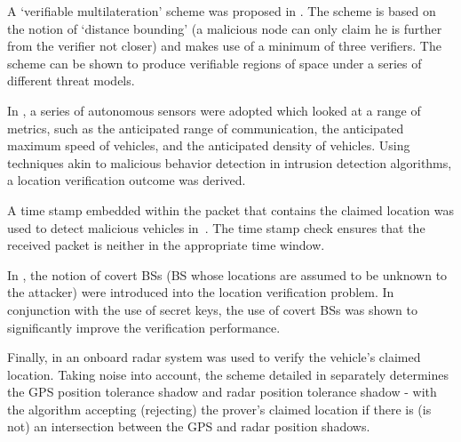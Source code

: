 \documentclass[journal]{IEEEtran}
\begin{document}
A `verifiable multilateration' scheme was proposed in \cite{capkun2006secure}. The scheme is based on the notion of `distance bounding' (a malicious node can only claim he is further from the verifier not closer) and makes use of a minimum of three verifiers. The scheme can be shown to produce verifiable regions of space under a series of different threat models.

In \cite{leinmuller2006position}, a series of autonomous sensors were adopted which looked at a range of metrics, such as the anticipated range of communication, the anticipated maximum speed of vehicles, and the anticipated density of vehicles. Using techniques akin to malicious behavior detection in intrusion detection algorithms, a location verification outcome was derived.

A time stamp embedded within the packet that contains the claimed location was used to detect malicious vehicles in~\cite{harsch2007secure}. The time stamp check ensures that the received packet is neither in the appropriate time window.

In \cite{rasmussen2008secure}, the notion of covert BSs (BS whose locations are assumed to be unknown to the attacker) were introduced into the location verification problem. In conjunction with the use of secret keys, the use of covert BSs was shown to significantly improve the verification performance.

Finally, in \cite{yan2008providing} an onboard radar system was used to verify the vehicle's claimed location. Taking noise into account, the scheme detailed in \cite{yan2008providing} separately determines the GPS position tolerance shadow and radar position tolerance shadow - with the algorithm accepting (rejecting) the prover's claimed location if there is (is not) an intersection between the GPS and radar position shadows.
\end{document}
